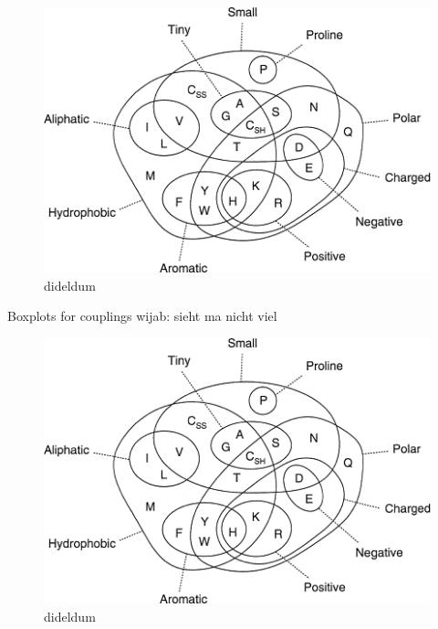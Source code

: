 \documentclass[11pt,a4paper,twoside]{book}
\theoremstyle{definition}
\theoremstyle{definition}
\theoremstyle{remark}
\begin{document}
\begin{figure}

{\centering \includegraphics[width=1\linewidth]{img/aa_venn_diagram} 

}

\caption{dideldum}\label{fig:comapring-cd-pll-scatter1}
\end{figure}

Boxplots for couplings wijab: sieht ma nicht viel

\begin{figure}

{\centering \includegraphics[width=1\linewidth]{img/aa_venn_diagram} 

}

\caption{dideldum}\label{fig:comapring-cd-pll-boxplot1}
\end{figure}
\end{document}
